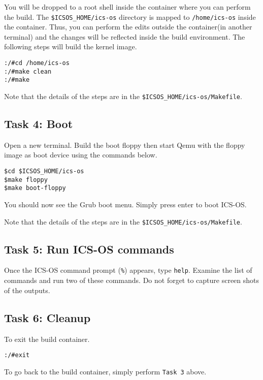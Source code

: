 \documentclass[a4paper, 11pt,oneside]{article}
\begin{document}
You will be dropped to a root shell inside the container where you can perform 
the build. The  \texttt{\$ICSOS\_HOME/ics-os} directory is mapped to 
\texttt{/home/ics-os} inside the container. Thus, you can perform the edits 
outside the container(in another terminal) and the changes will be reflected 
inside the build environment. The following steps will build the kernel image. 

\begin{verbatim}
:/#cd /home/ics-os
:/#make clean
:/#make
\end{verbatim}

Note that the details of the steps are in the 
\texttt{\$ICSOS\_HOME/ics-os/Makefile}.

\subsection*{Task 4: Boot}
Open a new terminal. Build the boot floppy then start Qemu with the floppy 
image as boot device using the commands below. 

\begin{verbatim}
$cd $ICSOS_HOME/ics-os
$make floppy
$make boot-floppy 
\end{verbatim}

You should now see the Grub boot menu. Simply press enter to boot ICS-OS.

Note that the details of the steps are in the 
\texttt{\$ICSOS\_HOME/ics-os/Makefile}.

\subsection*{Task 5: Run ICS-OS commands}
Once the ICS-OS command prompt (\texttt{\%}) appears, type \texttt{help}. 
Examine the list of commands and run two of these commands. Do not forget 
to capture screen shots of the outputs.

\subsection*{Task 6: Cleanup}
To exit the build container. 
\begin{verbatim}
:/#exit
\end{verbatim}

To go back to the build container, simply perform \texttt{Task 3} above.
\end{document}
